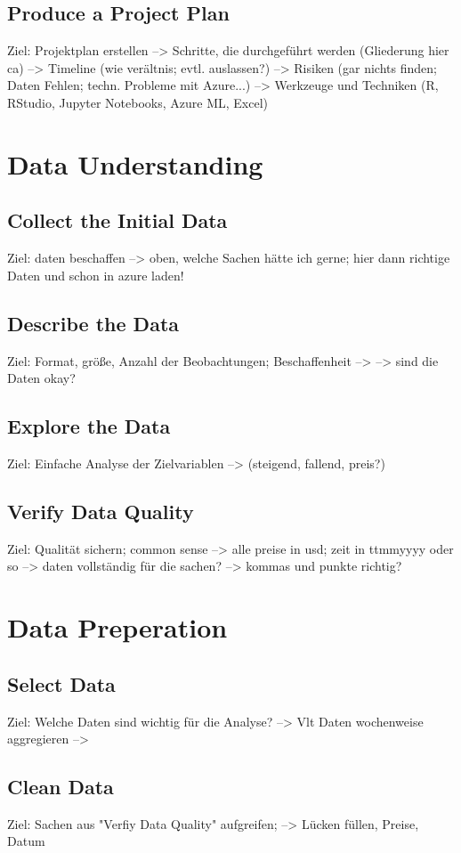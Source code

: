 \subsection{Produce a Project Plan}
Ziel: Projektplan erstellen
--> Schritte, die durchgeführt werden (Gliederung hier ca)
--> Timeline (wie verältnis; evtl. auslassen?)
--> Risiken (gar nichts finden; Daten Fehlen; techn. Probleme mit Azure...)
--> Werkzeuge und Techniken (R, RStudio, Jupyter Notebooks, Azure ML, Excel)

\section{Data Understanding}
\subsection{Collect the Initial Data}
Ziel: daten beschaffen
--> oben, welche Sachen hätte ich gerne; hier dann richtige Daten und schon in azure laden!

\subsection{Describe the Data}
Ziel: Format, größe, Anzahl der Beobachtungen; Beschaffenheit
-->
--> sind die Daten okay? 

\subsection{Explore the Data}
Ziel: Einfache Analyse der Zielvariablen 
--> (steigend, fallend, preis?)

\subsection{Verify Data Quality}
Ziel: Qualität sichern; common sense
--> alle preise in usd; zeit in ttmmyyyy oder so
--> daten vollständig für die sachen?
--> kommas und punkte richtig?

\section{Data Preperation}
\subsection{Select Data}
Ziel: Welche Daten sind wichtig für die Analyse?
--> Vlt Daten wochenweise aggregieren
--> 

\subsection{Clean Data}
Ziel: Sachen aus "Verfiy Data Quality" aufgreifen;
--> Lücken füllen, Preise, Datum

